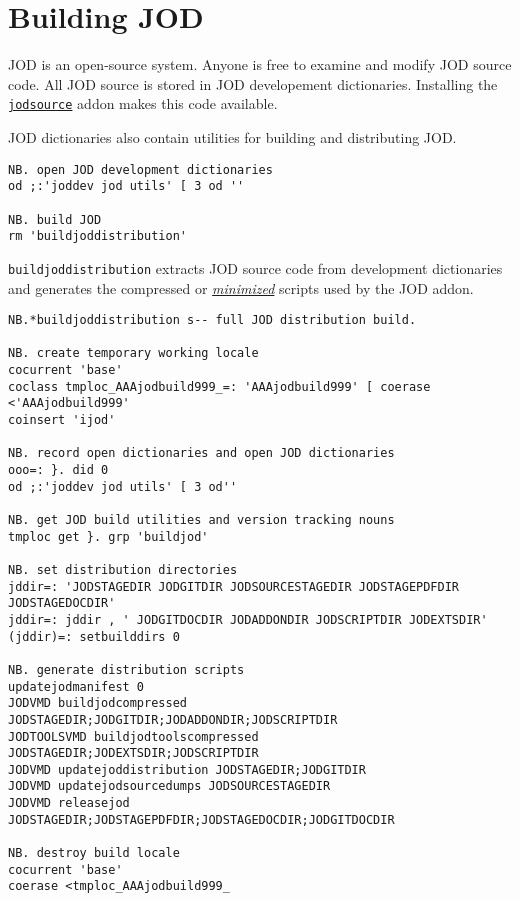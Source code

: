  \newpage
    \section{Building JOD}
    
    JOD is an open-source system. Anyone is free to examine and modify JOD source code. 
    All JOD source is stored in JOD developement dictionaries. Installing the
    \href{https://www.jsoftware.com/jwiki/Addons/general/jodsource}{\texttt{jodsource}}
    addon makes this code available.
    
    JOD dictionaries also contain utilities for building and distributing JOD. 
    
\begin{lstlisting}[frame=single,framerule=0pt,basicstyle=\ttfamily\footnotesize]    
NB. open JOD development dictionaries
od ;:'joddev jod utils' [ 3 od ''

NB. build JOD
rm 'buildjoddistribution'
\end{lstlisting}   
    
   \texttt{buildjoddistribution} extracts JOD source code from development dictionaries and generates the compressed or 
    \href{https://en.wikipedia.org/wiki/Minification_(programming)}{\emph{minimized}} scripts 
    used by the JOD addon.
    
\begin{lstlisting}[frame=single,framerule=0pt,basicstyle=\ttfamily\footnotesize]
NB.*buildjoddistribution s-- full JOD distribution build.

NB. create temporary working locale
cocurrent 'base'
coclass tmploc_AAAjodbuild999_=: 'AAAjodbuild999' [ coerase <'AAAjodbuild999'
coinsert 'ijod'

NB. record open dictionaries and open JOD dictionaries
ooo=: }. did 0
od ;:'joddev jod utils' [ 3 od''

NB. get JOD build utilities and version tracking nouns
tmploc get }. grp 'buildjod'

NB. set distribution directories
jddir=: 'JODSTAGEDIR JODGITDIR JODSOURCESTAGEDIR JODSTAGEPDFDIR JODSTAGEDOCDIR'
jddir=: jddir , ' JODGITDOCDIR JODADDONDIR JODSCRIPTDIR JODEXTSDIR' 
(jddir)=: setbuilddirs 0

NB. generate distribution scripts
updatejodmanifest 0
JODVMD buildjodcompressed JODSTAGEDIR;JODGITDIR;JODADDONDIR;JODSCRIPTDIR
JODTOOLSVMD buildjodtoolscompressed JODSTAGEDIR;JODEXTSDIR;JODSCRIPTDIR
JODVMD updatejoddistribution JODSTAGEDIR;JODGITDIR
JODVMD updatejodsourcedumps JODSOURCESTAGEDIR
JODVMD releasejod JODSTAGEDIR;JODSTAGEPDFDIR;JODSTAGEDOCDIR;JODGITDOCDIR

NB. destroy build locale
cocurrent 'base'
coerase <tmploc_AAAjodbuild999_
\end{lstlisting}
    
